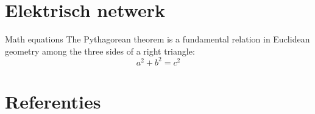 \documentclass{beamer}
\begin{document}
\section{Elektrisch netwerk}
		\begin{block}{Math equations}
			The Pythagorean theorem is a fundamental relation in Euclidean geometry among the three sides of a right triangle:
			\pause 
			\begin{equation}
				a^{2}+b^{2}=c^{2}
			\end{equation}  
		\end{block}   



\section*{Referenties}	


	
	



\begin{frame}	
\end{frame}
\end{document}
